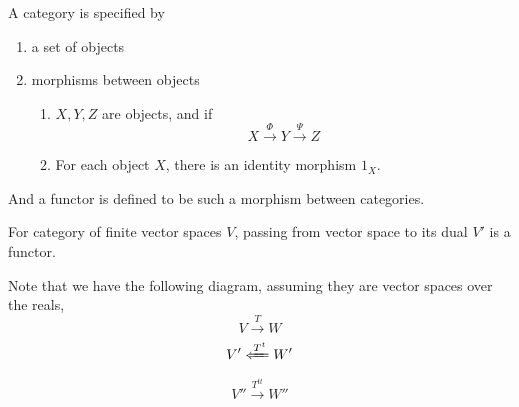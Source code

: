 \begin{definition}
    A category is specified by 
    \begin{enumerate}
        \item a set of objects
        \item morphisms between objects
        \begin{enumerate}
            \item $X, Y, Z$ are objects, and if
            \begin{equation*}
                X\xrightarrow{\Phi} Y\xrightarrow{\Psi} Z
            \end{equation*}
            \item For each object $X$, there is an identity morphism $1_X$.
        \end{enumerate}
    \end{enumerate}
    And a functor is defined to be such a morphism between categories.
\end{definition}
\begin{example}
    For category of finite vector spaces $V$, passing from vector space to its dual $V'$ is a functor.

    Note that we have the following diagram, assuming they are vector spaces over the reals,
    \begin{equation*}
        V\xrightarrow{T}W
    \end{equation*}
    \begin{equation*}
        V'\xLeftarrow{T^t}W'
    \end{equation*}
    \begin{equation*}
        V''\xrightarrow{T^{tt}}W''
    \end{equation*}
\end{example}

